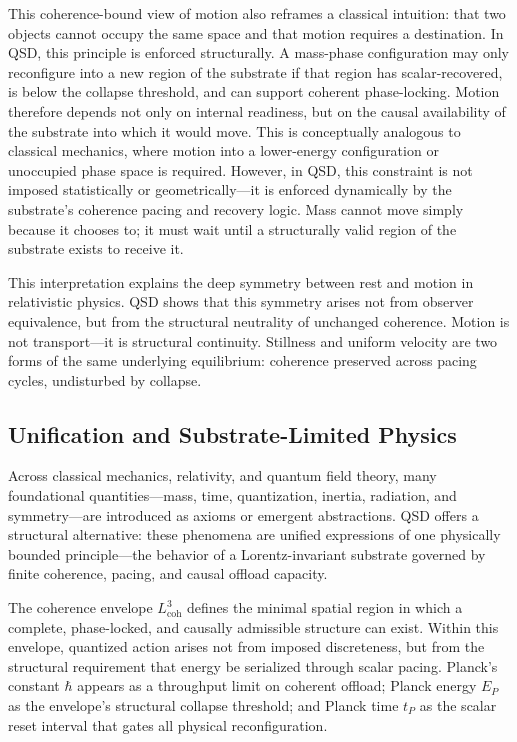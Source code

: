 \documentclass[entropy,article,submit,pdftex,moreauthors]{Definitions/mdpi}
\begin{document}
This coherence-bound view of motion also reframes a classical intuition: that two objects cannot occupy the same space and that motion requires a destination. In QSD, this principle is enforced structurally. A mass-phase configuration may only reconfigure into a new region of the substrate if that region has scalar-recovered, is below the collapse threshold, and can support coherent phase-locking. Motion therefore depends not only on internal readiness, but on the causal availability of the substrate into which it would move. This is conceptually analogous to classical mechanics, where motion into a lower-energy configuration or unoccupied phase space is required. However, in QSD, this constraint is not imposed statistically or geometrically—it is enforced dynamically by the substrate’s coherence pacing and recovery logic. Mass cannot move simply because it chooses to; it must wait until a structurally valid region of the substrate exists to receive it.

This interpretation explains the deep symmetry between rest and motion in relativistic physics. QSD shows that this symmetry arises not from observer equivalence, but from the structural neutrality of unchanged coherence. Motion is not transport—it is structural continuity. Stillness and uniform velocity are two forms of the same underlying equilibrium: coherence preserved across pacing cycles, undisturbed by collapse.


\subsection{Unification and Substrate-Limited Physics}

Across classical mechanics, relativity, and quantum field theory, many foundational quantities—mass, time, quantization, inertia, radiation, and symmetry—are introduced as axioms or emergent abstractions. QSD offers a structural alternative: these phenomena are unified expressions of one physically bounded principle—the behavior of a Lorentz-invariant substrate governed by finite coherence, pacing, and causal offload capacity.

The coherence envelope \texorpdfstring{\( L_{\text{coh}}^3 \)}{Lcoh\^{}3} defines the minimal spatial region in which a complete, phase-locked, and causally admissible structure can exist. Within this envelope, quantized action arises not from imposed discreteness, but from the structural requirement that energy be serialized through scalar pacing. Planck’s constant \texorpdfstring{\( \hbar \)}{hbar} appears as a throughput limit on coherent offload; Planck energy \texorpdfstring{\( E_P \)}{Ep} as the envelope’s structural collapse threshold; and Planck time \texorpdfstring{\( t_P \)}{tP} as the scalar reset interval that gates all physical reconfiguration.
\end{document}
